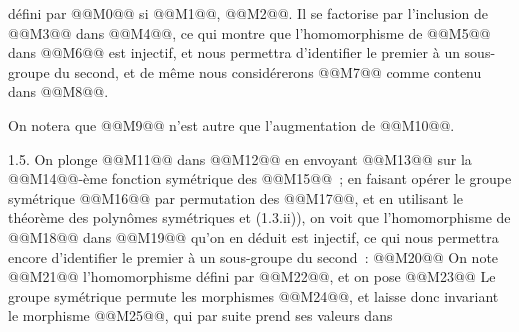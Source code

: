 
défini par @@M0@@ si @@M1@@, @@M2@@. Il se factorise par l'inclusion de @@M3@@ dans @@M4@@, ce qui montre que l'homomorphisme de @@M5@@ dans @@M6@@ est injectif, et nous permettra d'identifier le premier à un sous-groupe du second, et de même nous considérerons @@M7@@ comme contenu dans @@M8@@.

On notera que @@M9@@ n'est autre que l'augmentation de @@M10@@.

1.5. On plonge @@M11@@ dans @@M12@@ en envoyant @@M13@@ sur la @@M14@@-ème fonction symétrique des @@M15@@~; en faisant opérer le groupe symétrique @@M16@@ par permutation des @@M17@@, et en utilisant le théorème des polynômes symétriques et (1.3.ii)), on voit que l'homomorphisme de @@M18@@ dans @@M19@@ qu'on en déduit est injectif, ce qui nous permettra encore d'identifier le premier à un sous-groupe du second~:
@@M20@@%
On note
@@M21@@
l'homomorphisme défini par @@M22@@, et on pose
@@M23@@
Le groupe symétrique permute les morphismes @@M24@@, et laisse donc invariant le morphisme @@M25@@, qui par suite prend ses valeurs dans
